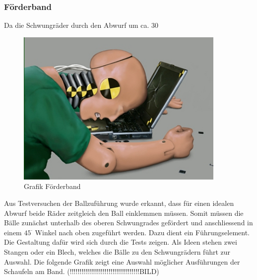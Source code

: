﻿\subsubsection{Förderband}
Da die Schwungräder durch den Abwurf um ca. 30%
\newpage
\begin{figure} [h!]
	\centering
	\includegraphics[width=0.9\textwidth]{Enddokumentation/CrashTestDummy.jpg}
	\caption{Grafik Förderband}
	\label{fig:Grafik Förderband}	
\end{figure}
Aus Testversuchen der Ballzuführung wurde erkannt, dass für einen idealen Abwurf beide Räder zeitgleich den Ball einklemmen müssen. Somit müssen die Bälle zunächst unterhalb des oberen Schwungrades gefördert und anschliessend in einem $45^\cdot$ Winkel nach oben zugeführt werden. Dazu dient ein Führungselement. Die Gestaltung dafür wird sich durch die Tests zeigen. Als Ideen stehen zwei Stangen oder ein Blech, welches die Bälle zu den Schwungrädern führt zur Auswahl. Die folgende Grafik zeigt eine Auswahl möglicher Ausführungen der Schaufeln am Band. (!!!!!!!!!!!!!!!!!!!!!!!!!!!!!!!!!!!!BILD)
